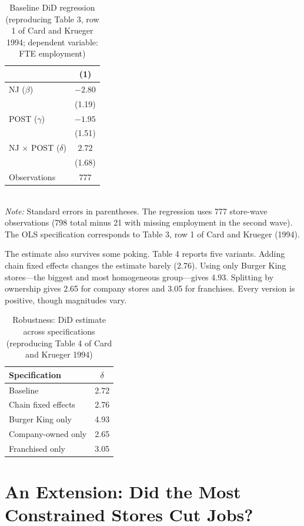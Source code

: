 \documentclass[11pt]{article}
\begin{document}
\begin{table}[h]
\centering
\caption{Baseline DiD regression (reproducing Table 3, row 1 of Card and Krueger 1994; dependent variable: FTE employment)}
\begin{tabular}{lc}
\toprule
 & (1) \\
\midrule
NJ ($\beta$) & $-2.80$ \\[-0.4em]
 & (1.19) \\
POST ($\gamma$) & $-1.95$ \\[-0.4em]
 & (1.51) \\
NJ $\times$ POST ($\delta$) & $2.72$ \\[-0.4em]
 & (1.68) \\
Observations & 777 \\
\bottomrule
\end{tabular}
\\[0.5em]
\small\textit{Note:} Standard errors in parentheses. The regression uses 777 store-wave observations (798 total minus 21 with missing employment in the second wave). The OLS specification corresponds to Table 3, row 1 of Card and Krueger (1994).
\end{table}

The estimate also survives some poking. Table 4 reports five variants. Adding chain fixed effects changes the estimate barely (2.76). Using only Burger King stores---the biggest and most homogeneous group---gives 4.93. Splitting by ownership gives 2.65 for company stores and 3.05 for franchises. Every version is positive, though magnitudes vary.

\begin{table}[h]
\centering
\caption{Robustness: DiD estimate across specifications (reproducing Table 4 of Card and Krueger 1994)}
\begin{tabular}{lc}
\toprule
Specification & $\delta$ \\
\midrule
Baseline & 2.72 \\
Chain fixed effects & 2.76 \\
Burger King only & 4.93 \\
Company-owned only & 2.65 \\
Franchised only & 3.05 \\
\bottomrule
\end{tabular}
\end{table}

\section{An Extension: Did the Most Constrained Stores Cut Jobs?}
\end{document}
